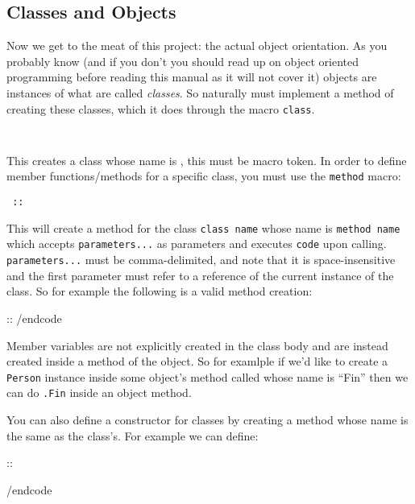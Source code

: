 \subsection{Classes and Objects}

Now we get to the meat of this project: the actual object orientation.
As you probably know (and if you don't you should read up on object oriented programming before reading this manual as it will
not cover it) objects are instances of what are called {\it classes}.
So naturally \OoP must implement a method of creating these classes, which it does through the macro {\tt class}.

\hfil{\tt\string\class\ }\hfil\par

This creates a class whose name is {\tt{}}, this must be macro token.
In order to define member functions/methods for a specific class, you must use the {\tt method} macro:

\hfil{\tt\string\method\ ::}\hfil\par

This will create a method for the class {\tt class name} whose name is {\tt method name} which accepts {\tt parameters...} as
parameters and executes {\tt code} upon calling.
{\tt parameters...} must be comma-delimited, and note that it is space-insensitive and the first parameter must refer to a
reference of the current instance of the class.
So for example the following is a valid method creation:

\begincode
\method\Person::
/endcode

Member variables are not explicitly created in the class body and are instead created inside a method of the object.
So for examlple if we'd like to create a {\tt Person} instance inside some object's method called {\tt\string\person}
whose name is ``Fin'' then we can do {\tt\string\Person\string\self.\string\person\lbrace Fin\rbrace} inside an object
method.

You can also define a constructor for classes by creating a method whose name is the same as the class's.
For example we can define:

\begincode
\class\Foo

\method\Foo::

\Foo{}
/endcode

